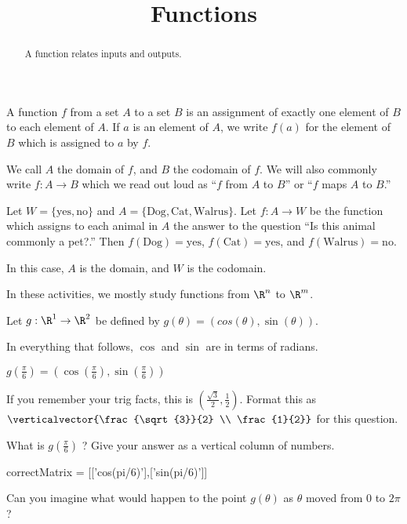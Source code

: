 \documentclass{ximera}
\title{Functions}
\begin{document}
\begin{abstract}
  A function relates inputs and outputs.
\end{abstract}

\begin{definition}
  A function $f$ from a set $A$ to a set $B$ is an assignment of
  exactly one element of $B$ to each element of $A$.  If $a$ is an
  element of $A$, we write $f(a)$ for the element of $B$ which is
  assigned to $a$ by $f$.
\end{definition}

We call $A$ the domain of $f$, and $B$ the codomain of $f$.  We will
also commonly write $f:A \to B$ which we read out loud as ``$f$ from
$A$ to $B$'' or ``$f$ maps $A$ to $B$.''

\begin{example}
  Let $W =\{ \text{yes},\text{no}\}$ and $A = \{ \text{Dog},
  \text{Cat}, \text{Walrus}\}$.  Let $f:A \to W$ be the function which
  assigns to each animal in $A$ the answer to the question ``Is this
  animal commonly a pet?.''  Then $f(\text{Dog}) = \text{yes}$,
  $f(\text{Cat}) = \text{yes}$, and $f(\text{Walrus}) =
  \text{no}$.

  In this case, $A$ is the domain, and $W$ is the codomain.
\end{example}

In these activities, we mostly study functions from $\R^n$ to $\R^m$.

\begin{question}
  Let $g:\R^1 \to \R^2$ be defined by $g(\theta) = (cos(\theta),\sin(\theta))$.
  \begin{solution}
    \begin{hint}
      \begin{warning}
        In everything that follows, $\cos$ and $\sin$ are in terms of radians.
      \end{warning}
    \end{hint}
    \begin{hint}
      $g(\frac{\pi}{6}) = (\cos(\frac{\pi}{6}),\sin(\frac{\pi}{6}))$
    \end{hint}
    \begin{hint}
      If you remember your trig facts, this is
      $(\frac{\sqrt{3}}{2},\frac{1}{2})$.  Format this as
      $\verticalvector{\frac{\sqrt{3}}{2} \\ \frac{1}{2}}$ for
      this question.
    \end{hint}
    What is $g(\frac{\pi}{6})$ ?  Give your answer as a vertical column of numbers.
    \begin{matrix-answer}
      correctMatrix = [['cos(pi/6)'],['sin(pi/6)']]
    \end{matrix-answer}
  \end{solution}
  
  Can you imagine what would happen to the point $g(\theta)$ as $\theta$ moved from $0$ to $2\pi$?
\end{question}
\end{document}
